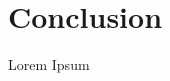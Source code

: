 \documentclass[main.tex]{subfiles}
\begin{document}
\section{Conclusion}
Lorem Ipsum
\end{document}
